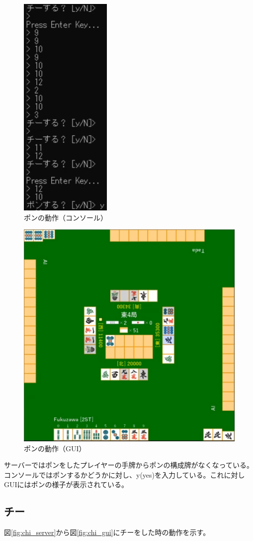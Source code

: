 \documentclass[a4j,titlepage]{jsarticle}
\begin{document}
\begin{figure}[htbp]
  \centering
  \includegraphics[width = 0.2\linewidth]{images/pon_console.png}
  \caption{ポンの動作（コンソール）}
  \label{fig:pon_console}
\end{figure}

\begin{figure}[htbp]
  \centering
  \includegraphics[width = 0.8\linewidth]{images/pon_gui.png}
  \caption{ポンの動作（GUI）}
  \label{fig:pon_gui}
\end{figure}

サーバーではポンをしたプレイヤーの手牌からポンの構成牌がなくなっている。コンソールではポンするかどうかに対し、y(yes)を入力している。これに対しGUIにはポンの様子が表示されている。

\subsection{チー}
図\ref{fig:chi_server}から図\ref{fig:chi_gui}にチーをした時の動作を示す。
\end{document}
